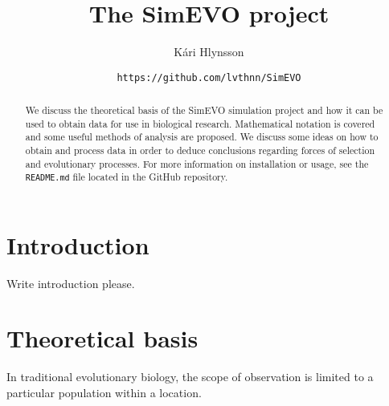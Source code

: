 \documentclass[a4paper, 12pt]{article}
\title{
    The SimEVO project
}
\author{Kári Hlynsson}
\date{\small \lstinline{https://github.com/lvthnn/SimEVO}}
\begin{document}
    \maketitle

    \begin{abstract}
        \noindent We discuss the theoretical basis of the SimEVO simulation project
        and how it can be used to obtain data for use in biological research. Mathematical
        notation is covered and some useful methods of analysis are proposed. We discuss some
        ideas on how to obtain and process data in order to deduce conclusions regarding forces of
        selection and evolutionary processes. For more information on installation or usage, see the
        \lstinline{README.md} file located in the GitHub repository.
    \end{abstract}

    \tableofcontents

    \section{Introduction}
    Write introduction please.

    \section{Theoretical basis}
    In traditional evolutionary biology, the scope of observation is limited to a particular population within a location.
    
 
\end{document}

